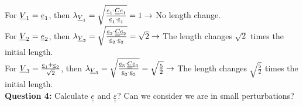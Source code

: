 \documentclass[letter,12pt]{article}
\newcommand{\TT}[1]{\underline{\underline{#1}}}
\newcommand{\T}[1]{\underline{#1}}
\begin{document}
	For $\underline{V}_1 = \underline{e}_1$, then $\lambda_{\underline{V}_1} = \sqrt{\frac{\underline{e}_1 \cdot \underline{\underline{C}} \underline{e}_1}{\underline{e}_1 \cdot \underline{e}_1}} = 1 \rightarrow $ No length change. \\
	
	For $\underline{V}_2 = \underline{e}_2$, then $\lambda_{\underline{V}_2} = \sqrt{\frac{\underline{e}_2 \cdot \underline{\underline{C}} \underline{e}_2}{\underline{e}_2 \cdot \underline{e}_2}} = \sqrt{2} \rightarrow $ The length changes $\sqrt{2}$ times the initial length. \\
	
	For $\Vu_3 = \frac{\T{e}_1+\T{e}_2}{\sqrt{2}}$, then $\lambda_{\underline{V}_3} = \sqrt{\frac{\underline{e}_3 \cdot \underline{\underline{C}} \underline{e}_3}{\underline{e}_3 \cdot \underline{e}_3}} = \sqrt{\frac{5}{2}} \rightarrow $ The length changes $\sqrt{\frac{5}{2}}$ times the initial length. \\
	
	\noindent \textbf{Question 4:} Calculate $\TT{e}$ and $\TT{\varepsilon}$? Can we consider we are in small perturbations? \\
	
\end{document}

